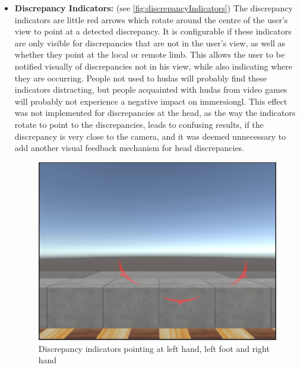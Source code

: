\begin{itemize}
    
    \item \textbf{Discrepancy Indicators:} (see \autoref{fig:discrepancyIndicators})
    \newline
    The discrepancy indicators are little red arrows which rotate around the centre of the user's view to point at a detected discrepancy. It is configurable if these indicators are only visible for discrepancies that are not in the user's view, as well as whether they point at the local or remote limb.
    \newline
    This allows the user to be notified visually of discrepancies not in his view, while also indicating where they are occurring. People not used to \glspl{huda} will probably find these indicators distracting, but people acquainted with \glspl{huda} from video games will probably not experience a negative impact on \gls{immersiongl}.
    This effect was not implemented for discrepancies at the head, as the way the indicators rotate to point to the discrepancies, leads to confusing results, if the discrepancy is very close to the camera, and it was deemed unnecessary to add another visual feedback mechanism for head discrepancies.
    
    \begin{figure}[h]
        \centering
        \includegraphics[height=0.2\textheight]{figures/DiscrepancyIndicators.png}
        \caption{Discrepancy indicators pointing at left hand, left foot and right hand}
        \label{fig:discrepancyIndicators}
    \end{figure}



\end{itemize}
